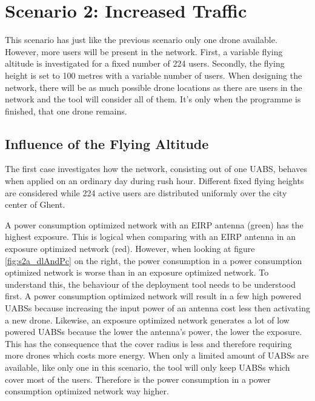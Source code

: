 \FloatBarrier
\section{Scenario 2: Increased Traffic}

This scenario has just like the previous scenario only one drone available. However, more users will be present in the network.
First, a variable flying altitude is investigated for a fixed number of 224 users. 
Secondly, the flying height is set to 100 metres with a variable number of users.
When designing the network, there will be as much possible drone locations as there are users in the network and the tool
will consider all of them. It's only when the programme is finished, that one drone remains.

\subsection{Influence of the Flying Altitude}
The first case investigates how the network, consisting out of one \gls{UABS}, behaves when applied on an ordinary day during rush hour. 
Different fixed flying heights are considered while 224 active users are distributed uniformly over the city center of Ghent. 

A power consumption optimized network with an \gls{EIRP} antenna (green) has the highest exposure. 
This is logical when comparing with an EIRP antenna in an exposure optimized network (red). 
However, when looking at figure \ref{fig:s2a_dlAndPc} on the right, the power consumption in a power consumption optimized network is worse 
than in an exposure optimized network. To understand this, the behaviour of the deployment tool needs to be understood first. 
A power consumption optimized network will result in a few high powered \gls{UABS}s because increasing the input power of an antenna cost 
less then activating a new  drone. Likewise, an exposure optimized network 
generates a lot of low powered \gls{UABS}s because the lower the antenna's power, the lower the exposure. This has the consequence that the cover radius 
is less and therefore requiring more drones which costs more energy.
When only a limited amount of \gls{UABS}s are available, 
like only one in this scenario, the tool will only keep \gls{UABS}s which cover most of the users. 
Therefore is the power consumption in a power consumption optimized network way higher. 



